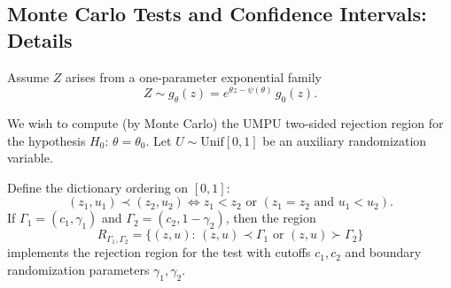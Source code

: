 \documentclass{article}
\theoremstyle{definition}
\begin{document}
\begin{appendix}

\section{Monte Carlo Tests and Confidence Intervals: Details}\label{sec:mcUMPU}


Assume $Z$ arises from a one-parameter exponential family
\begin{equation}
  Z \sim g_\theta(z) = e^{\theta z - \psi(\theta)}\,g_0(z).
\end{equation}

We wish to compute (by Monte Carlo) the UMPU two-sided rejection region for the hypothesis $H_0:\,\theta = \theta_0$. Let $U\sim \text{Unif}[0,1]$ be an auxiliary randomization variable.

Define the dictionary ordering on $[0,1]$:
\begin{equation}
  (z_1,u_1) \prec (z_2,u_2) \iff z_1 < z_2 \text{ or } (z_1 = z_2 \text{ and } u_1 < u_2).
\end{equation}
If $\Gamma_1 = (c_1, \gamma_1)$ and $\Gamma_2 = (c_2, 1-\gamma_2)$, then the region
\begin{equation}
  R_{\Gamma_1,\Gamma_2} = \{(z,u):\, (z,u) \prec \Gamma_1 \text{ or } (z,u) \succ \Gamma_2\}
\end{equation}
implements the rejection region for the test with cutoffs $c_1,c_2$ and boundary randomization parameters $\gamma_1,\gamma_2$.


\end{appendix}
\end{document}
